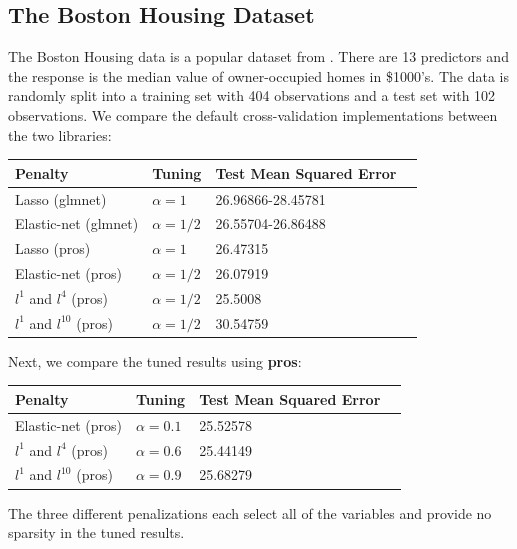 \documentclass[article]{jss}
\numberwithin{equation}{section}
\begin{document}
\subsection{The Boston Housing Dataset}

The Boston Housing data is a popular dataset from \cite{boston_housing}.
There are 13 predictors and the response is the median value of owner-occupied homes in \$1000's. 
The data is randomly split into a training set with 404 observations and a test set with 102 observations.
We compare the default cross-validation implementations between the two libraries:

\begin{center}
\setlength{\tabcolsep}{20pt} %
\renewcommand{\arraystretch}{1} %
\begin{tabular}{lllp{7.4cm}}
\hline
Penalty & Tuning & Test Mean Squared Error \\ \hline
Lasso (glmnet) & $\alpha = 1$ & 26.96866-28.45781 \\
Elastic-net (glmnet) & $\alpha = 1/2$  & 26.55704-26.86488   \\
Lasso (pros) & $\alpha = 1$ &  26.47315 \\
Elastic-net (pros) & $\alpha = 1/2$ &  26.07919 \\
$l^1$ and $l^{4}$ (pros) & $\alpha = 1/2$ &  25.5008 \\
$l^1$ and $l^{10}$ (pros) & $\alpha = 1/2$ &  30.54759 \\ \hline
\end{tabular}
\end{center}

Next, we compare the tuned results using \textbf{pros}:

\begin{center}
\setlength{\tabcolsep}{20pt} %
\renewcommand{\arraystretch}{1} %
\begin{tabular}{lllp{7.4cm}}
\hline
Penalty & Tuning & Test Mean Squared Error \\ \hline
Elastic-net (pros) & $\alpha = 0.1$ & 25.52578 \\
$l^1$ and $l^{4}$ (pros) & $\alpha = 0.6$ &  25.44149 \\
$l^1$ and $l^{10}$ (pros) & $\alpha = 0.9$ &  25.68279 \\ \hline
\end{tabular}
\end{center}

The three different penalizations each select all of the variables and provide no sparsity in the tuned results.
\end{document}
